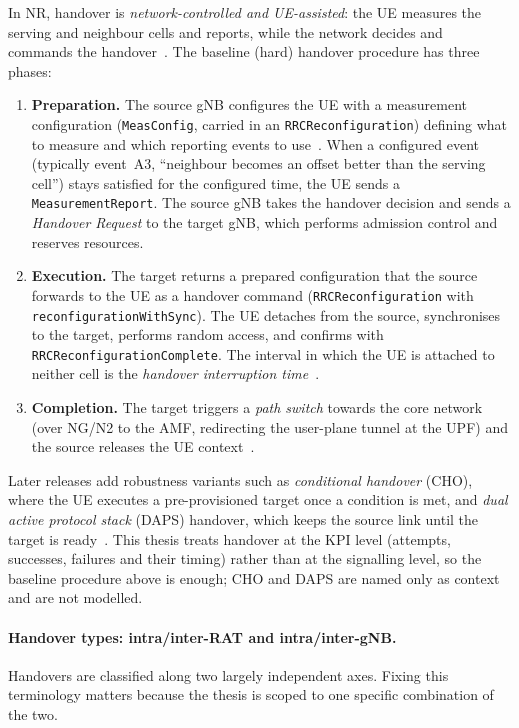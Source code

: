In NR, handover is \emph{network-controlled and UE-assisted}: the UE measures
the serving and neighbour cells and reports, while the network decides and
commands the handover~\cite{ts38300,ts38331}. The baseline (hard) handover
procedure has three phases:
\begin{enumerate}
  \item \textbf{Preparation.} The source gNB configures the UE with a
  measurement configuration (\texttt{MeasConfig}, carried in an
  \texttt{RRCReconfiguration}) defining what to measure and which reporting
  events to use~\cite{ts38331}. When a configured event (typically event~A3,
  ``neighbour becomes an offset better than the serving cell'') stays satisfied
  for the configured time, the UE sends a \texttt{MeasurementReport}. The source
  gNB takes the handover decision and sends a \emph{Handover Request} to the
  target gNB, which performs admission control and reserves resources.
  \item \textbf{Execution.} The target returns a prepared configuration that the
  source forwards to the UE as a handover command
  (\texttt{RRCReconfiguration} with \texttt{reconfigurationWithSync}). The UE
  detaches from the source, synchronises to the target, performs random access,
  and confirms with \texttt{RRCReconfigurationComplete}. The interval in which
  the UE is attached to neither cell is the \emph{handover interruption
  time}~\cite{ts38300,ts38331}.
  \item \textbf{Completion.} The target triggers a \emph{path switch} towards the
  core network (over NG/N2 to the AMF, redirecting the user-plane tunnel at the
  UPF) and the source releases the UE context~\cite{ts38300}.
\end{enumerate}
Later releases add robustness variants such as \emph{conditional handover}
(CHO), where the UE executes a pre-provisioned target once a condition is met,
and \emph{dual active protocol stack} (DAPS) handover, which keeps the source
link until the target is ready~\cite{ts38300}. This thesis treats handover at the
KPI level (attempts, successes, failures and their timing) rather than at the
signalling level, so the baseline procedure above is enough; CHO and DAPS are
named only as context and are not modelled.

\paragraph{Handover types: intra/inter-RAT and intra/inter-gNB.}
Handovers are classified along two largely independent axes. Fixing this
terminology matters because the thesis is scoped to one specific combination of
the two.


